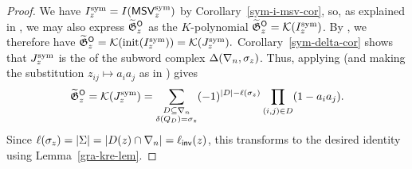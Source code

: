 \documentclass[10pt]{article}
\begin{document}
\begin{proof}
We have $I^{\mathrm{sym}}_z = I(\mathsf{MSV}^{\mathrm{sym}}_z)$
by
Corollary~\ref{sym-i-msv-cor},
so, as explained in \cite[\S7.2]{MarPaw2024}, we may also express $\widetilde{\mathfrak{G}}^{\textsf{O}}_z$ as 
 the $K$-polynomial 
 $
 \widetilde{\mathfrak{G}}^{\textsf{O}}_z = \mathcal{K}(I^{\mathrm{sym}}_z)
 $.  
 By \cite[Lem.~4.17]{MarPaw2022}, we therefore have 
 $ \widetilde{\mathfrak{G}}^{\textsf{O}}_z = \mathcal{K}(\mathrm{init}(I^{\mathrm{sym}}_z)) = \mathcal{K}(J^{\mathrm{sym}}_z).$
Corollary~\ref{sym-delta-cor} shows that $J^{\mathrm{sym}}_z$ is the  \cite[Def.~1.6]{MS} of the subword complex $\Delta(\nabla_n,\sigma_z)$.
Thus, applying \cite[Thm.~4.1]{KnutsonMillerSubword} (and making the substitution $z_{ij}\mapsto a_ia_j$ as in \cite[Prop.~5.3]{KnutsonMillerSubword}) gives
  \[
 \widetilde{\mathfrak{G}}^{\textsf{O}}_z = \mathcal{K}(J^{\mathrm{sym}}_z)=\sum_{\substack{D \subseteq \nabla_n \\ \delta(Q_D)=\sigma_z}} (-1)^{|D|-\ell(\sigma_z)} \prod_{(i,j) \in D} (1-a_i a_j).
 \]
 Since $\ell(\sigma_z) = |\Sigma|= |D(z)\cap \nabla_n|= \ell_{\mathsf{inv}}(z)$, this  transforms to the desired identity
  using Lemma~\ref{gra-kre-lem}.
 \end{proof}

%


\printbibliography
\end{document}
